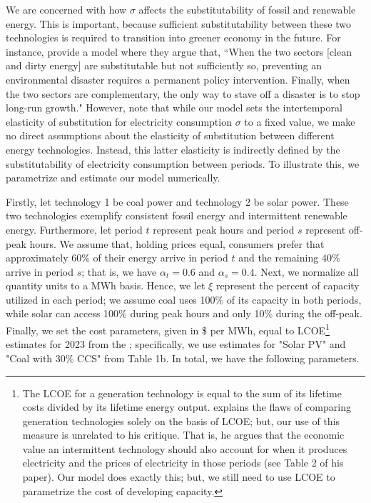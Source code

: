 \documentclass[11pt,a4paper]{extarticle}
\begin{document}
We are concerned with how $\sigma$ affects the substitutability of fossil and renewable energy. This is important, because sufficient substitutability between these two technologies is required to transition into greener economy in the future. For instance, \citet{Ace2012} provide a model where they argue that, ``When the two
sectors [clean and dirty energy] are substitutable but not sufficiently so, preventing an environmental disaster requires a permanent policy intervention. Finally, when the two sectors are complementary, the only way to stave off a disaster is to stop long-run growth." However, note that while our model sets the intertemporal elasticity of substitution for  electricity consumption $\sigma$ to a fixed value, we make no direct assumptions about the elasticity of substitution between different energy technologies. Instead, this latter elasticity is indirectly defined by the substitutability of electricity consumption between periods. To illustrate this, we parametrize and estimate our model numerically.

Firstly, let technology 1 be coal power and technology 2 be solar power. These two technologies exemplify consistent fossil energy and intermittent renewable energy. Furthermore,  let period $t$ represent peak hours and period $s$ represent off-peak hours. We assume that, holding prices equal, consumers prefer that approximately 60\% of their energy arrive in period $t$ and the remaining 40\% arrive in period $s$; that is, we have $\alpha_t = 0.6$ and $\alpha_s = 0.4$. Next, we normalize all quantity units to a MWh basis. Hence, we let $\xi$ represent the percent of capacity utilized in each period; we assume coal uses 100\% of its capacity in both periods, while solar can access 100\% during peak hours and only 10\% during the off-peak. Finally, we set the cost parameters, given in  \$ per MWh, equal to LCOE\footnote{ The LCOE for a generation technology is equal to the sum of its lifetime costs divided by its lifetime energy output. \citet{Joskow2011} explains the flaws of comparing generation technologies solely on the basis of LCOE; but,  our use of this measure is unrelated to his critique. That is, he argues that the economic value an intermittent technology should also account for when it produces electricity and the prices of electricity in those periods (see Table 2 of his paper). Our model does exactly this; but, we still need to  use LCOE to parametrize the cost of developing capacity. } estimates for 2023 from the \citet{EIALCOE}; specifically, we use estimates for "Solar PV" and "Coal with 30\% CCS" from Table 1b.  In total, we have the following parameters. 
\end{document}
